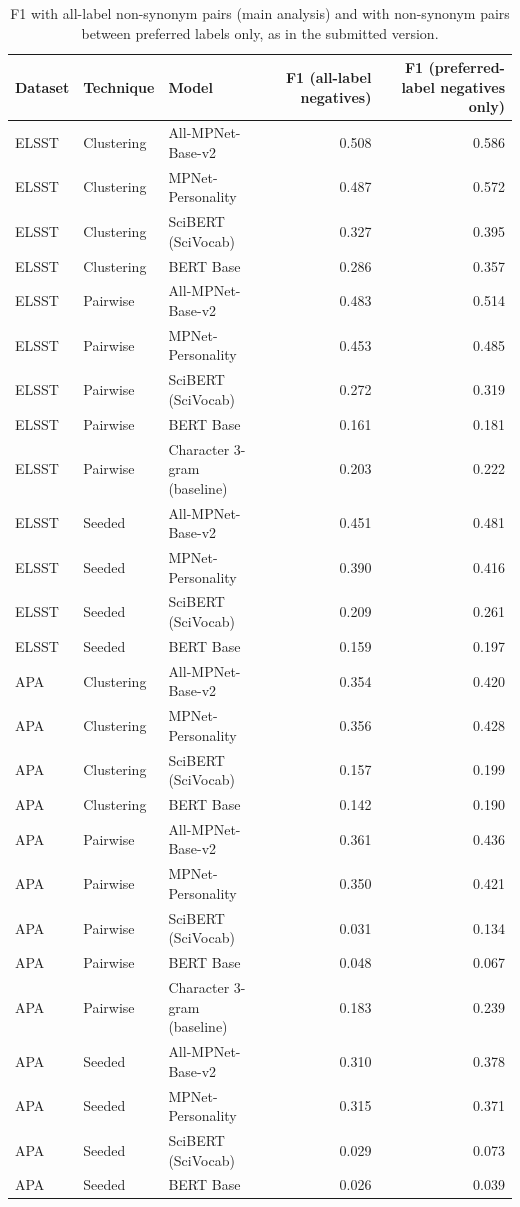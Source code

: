 \begin{table}[ht]
\centering
\small
\caption{F1 with all-label non-synonym pairs (main analysis) and with non-synonym pairs between preferred labels only, as in the submitted version.}
\label{tab:S8_preferred_label_negatives}
\begin{tabular}{lllrr}
\toprule
Dataset & Technique & Model & F1 (all-label negatives) & F1 (preferred-label negatives only) \\
\midrule
ELSST & Clustering & All-MPNet-Base-v2 & 0.508 & 0.586 \\
ELSST & Clustering & MPNet-Personality & 0.487 & 0.572 \\
ELSST & Clustering & SciBERT (SciVocab) & 0.327 & 0.395 \\
ELSST & Clustering & BERT Base & 0.286 & 0.357 \\
ELSST & Pairwise & All-MPNet-Base-v2 & 0.483 & 0.514 \\
ELSST & Pairwise & MPNet-Personality & 0.453 & 0.485 \\
ELSST & Pairwise & SciBERT (SciVocab) & 0.272 & 0.319 \\
ELSST & Pairwise & BERT Base & 0.161 & 0.181 \\
ELSST & Pairwise & Character 3-gram (baseline) & 0.203 & 0.222 \\
ELSST & Seeded & All-MPNet-Base-v2 & 0.451 & 0.481 \\
ELSST & Seeded & MPNet-Personality & 0.390 & 0.416 \\
ELSST & Seeded & SciBERT (SciVocab) & 0.209 & 0.261 \\
ELSST & Seeded & BERT Base & 0.159 & 0.197 \\
APA & Clustering & All-MPNet-Base-v2 & 0.354 & 0.420 \\
APA & Clustering & MPNet-Personality & 0.356 & 0.428 \\
APA & Clustering & SciBERT (SciVocab) & 0.157 & 0.199 \\
APA & Clustering & BERT Base & 0.142 & 0.190 \\
APA & Pairwise & All-MPNet-Base-v2 & 0.361 & 0.436 \\
APA & Pairwise & MPNet-Personality & 0.350 & 0.421 \\
APA & Pairwise & SciBERT (SciVocab) & 0.031 & 0.134 \\
APA & Pairwise & BERT Base & 0.048 & 0.067 \\
APA & Pairwise & Character 3-gram (baseline) & 0.183 & 0.239 \\
APA & Seeded & All-MPNet-Base-v2 & 0.310 & 0.378 \\
APA & Seeded & MPNet-Personality & 0.315 & 0.371 \\
APA & Seeded & SciBERT (SciVocab) & 0.029 & 0.073 \\
APA & Seeded & BERT Base & 0.026 & 0.039 \\
\bottomrule
\end{tabular}
\end{table}
